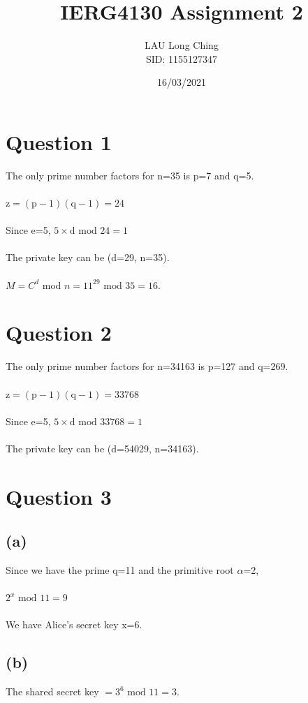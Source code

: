 \documentclass[a4paper]{article}
\title{\vspace{-1.5cm}IERG4130 Assignment 2}
\author{LAU Long Ching\\SID: 1155127347\\
        
}
\date{16/03/2021}
\begin{document}
\maketitle
\section*{Question 1}
The only prime number factors for n=35 is p=7 and q=5.\\\\
$\textrm{z} = (\textrm{p}-1)(\textrm{q}-1) = 24$\\\\
Since e=5, $5\times \textrm{d} \textrm{ mod } 24 = 1$\\\\
The private key can be (d=29, n=35).\\\\
$M = C^d \textrm{ mod } n = 11^{29} \textrm{ mod } 35 = 16$.

\section*{Question 2}
The only prime number factors for n=34163 is p=127 and q=269.\\\\
$\textrm{z} = (\textrm{p}-1)(\textrm{q}-1) = 33768$\\\\
Since e=5, $5\times \textrm{d} \textrm{ mod } 33768 = 1$\\\\
The private key can be (d=54029, n=34163).

\section*{Question 3}
\subsection*{(a)}
Since we have the prime q=11 and the primitive root $\alpha$=2,\\\\
$2^{x} \textrm{ mod } 11 = 9$\\\\
We have Alice's secret key x=6.
\subsection*{(b)}
The shared secret key $ = 3^6 \textrm{ mod } 11 = 3$.
\pagebreak
\end{document}
